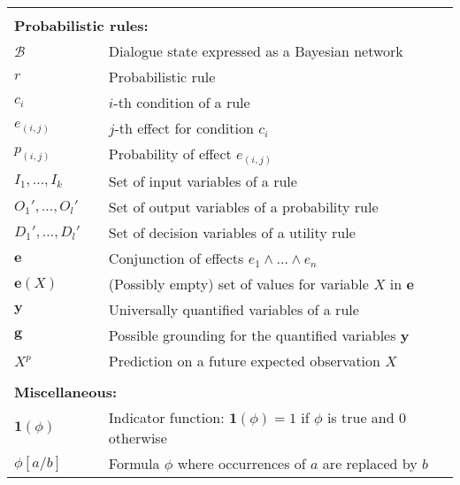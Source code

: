 \begin{longtable}{lp{5mm}p{95mm}}
&&  \vspace{3mm} \\
\multicolumn{3}{l}{\textbf{Probabilistic rules:}} \vspace{2mm} \\
$\mathcal{B}$ && Dialogue state expressed as a Bayesian network \\
$r$ && Probabilistic rule \\
$c_i$ && $i$-th condition of a rule \\
$e_{(i,j)}$ && $j$-th effect for condition $c_i$ \\
$p_{(i,j)}$ && Probability of effect $e_{(i,j)}$ \\
$I_1, \dots, I_{k}$  && Set of input variables of a rule\\
$O_1', \dots, O_{l}'$ && Set of output variables of a probability rule \\
$D_1', \dots, D_{l}'$ && Set of decision variables of a utility rule \\
$\mathbf{e}$ && Conjunction of effects $e_1 \land \dots \land e_n$ \\
$\mathbf{e}(X)$ && (Possibly empty) set of values for variable $X$ in $\mathbf{e}$ \\
$\mathbf{y}$ && Universally quantified variables of a rule  \\
$\mathbf{g}$ && Possible grounding for the quantified variables $\mathbf{y}$ \\
$X^p$ && Prediction on a future expected observation $X$ \\
&&  \vspace{3mm} \\
\multicolumn{3}{l}{\textbf{Miscellaneous:}} \vspace{2mm} \\
$\mathbf{1}(\phi)$ && Indicator function: $\mathbf{1}(\phi)\!=\!1$ if $\phi$ is true and 0 otherwise \\
$\phi[a / b]$ && Formula $\phi$ where occurrences of $a$ are replaced by $b$ \\
\end{longtable}
